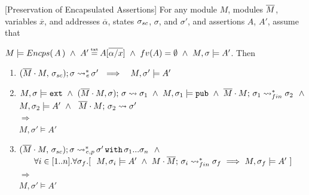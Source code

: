 \begin{auxLemma}
\label{lemma:external_exec_preserves_more}[Preservation of Encapsulated Assertions]
For any module $M$, modules $\overline{M}$, variables $\overline x$, and addresses $\overline \alpha$,
 states $\sigma_{sc}$, $\sigma$, and $\sigma'$, and assertions $A$, $A'$, 
assume that

\noindent
 $M \models \encaps A \   \wedge  \ A'\txteq A[\overline{\alpha/x}]\  \wedge \ fv(A)=\emptyset \  \wedge \ 
M, \sigma \models  A' $. Then

\begin{enumerate}

\item
$   (\overline{M}\cdot M,\, {\sigma_{sc}}); \sigma \rightsquigarrow ^*\!\!\!\!_{e}\, \sigma' 
\ \ \Longrightarrow \ \ \ M, \sigma' \models A'$

\item
$M, \sigma  \models \mbox{\normalfont{\texttt{ext}}} \ \wedge \  (\overline{M}\cdot M, \sigma);\, {\sigma} \rightsquigarrow \sigma_{1} \ \wedge
 \ M, \sigma_1 \models \mbox{\normalfont{\texttt{pub}}} \ \wedge\  \overline{M}\cdot M;\, {\sigma_1} \rightsquigarrow^*_{fin} \sigma_2    \ \ \wedge$\\
$ M, \sigma_2 \models A' \ \wedge \ 
  \   \leadstoBounded  {\Mtwo\cdot M} {\sigma_2}      {\sigma'}$\\
 $\Longrightarrow $
\\
$M, \sigma' \models A' $

\item
$ \leadstoBoundedThreeExtPub {\Mtwo\cdot M} {\sigma\bd}  {\sigma}  {\sigma'}\,  \prg{with}\,  \sigma_1...\sigma_{n}\ \ \wedge $\\
 $\strut \ \ \ \  \  \forall i\in [1..n]. \forall \sigma_{f}.[ \ \  M, \sigma_i \models A'  \ \wedge \  \leadstoBoundedStarFin {M\cdot \Mtwo}  {\sigma_i}  {\sigma_{f}} \ 
\Longrightarrow \  M, \sigma_f \models A' \ ]$\\
$\Longrightarrow $
\\
$M, \sigma' \models A' $
\end{enumerate}
\end{auxLemma}


